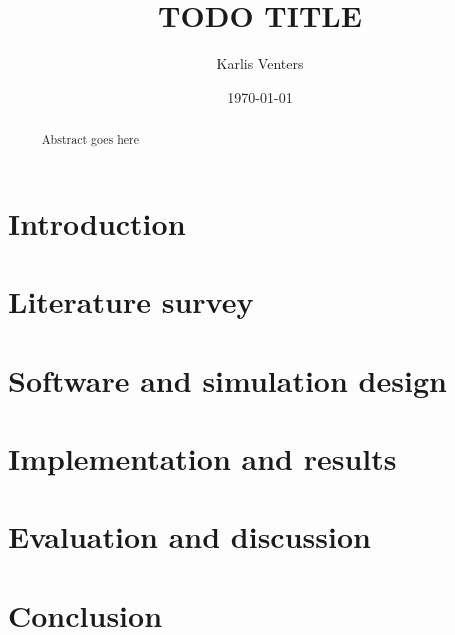 \documentclass{csfourzero}
\title{TODO TITLE}
\author{Karlis Venters}
\date{\today}
\begin{document}
\maketitle

\begin{abstract}~
Abstract goes here
\end{abstract}

\section{Introduction}
\label{sec:intro}
% 

\section{Literature survey}
\label{sec:literature}


\section{Software and simulation design}
\label{sec:software}
% 

\section{Implementation and results}
\label{sec:results}
% 

\section{Evaluation and discussion}
\label{sec:evaluation}
% 

\section{Conclusion}
\label{sec:conclusion}
% 

\newpage
\printbibliography
\end{document}
